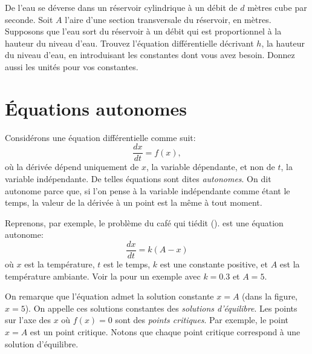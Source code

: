 \begin{exercise}
	De l'eau se déverse dans un réservoir cylindrique à un débit de $d$ mètres cube par seconde.
	Soit $A$ l'aire d'une section transversale du réservoir, en mètres.
	Supposons que l'eau sort du réservoir à un débit qui est proportionnel à la hauteur du niveau d'eau.
	Trouvez l'équation différentielle décrivant $h$, la hauteur du niveau d'eau, en introduisant les constantes dont vous avez besoin.
	Donnez aussi les unités pour vos constantes.
\end{exercise}



\sectionnewpage
\section{Équations autonomes}
\label{auteq:section}


Considérons une équation différentielle comme suit:
\begin{equation*}
	\frac{dx}{dt} = f(x),
\end{equation*}
où la dérivée dépend uniquement de $x$, la variable dépendante, et non de $t$, la variable indépendante.
De telles équations sont dites \emph{autonomes}.
On dit \og{}autonome\fg{} parce que, si l'on pense à la variable indépendante comme étant le temps, la valeur de la dérivée à un point est la même à tout moment.

Reprenons, par exemple, le problème du café qui tiédit ().
 est une équation autonome:
\begin{equation*}
	\frac{dx}{dt} = k (A-x)
\end{equation*}
où $x$ est la température, $t$ est le temps, $k$ est une constante positive,
et $A$ est la température ambiante.
 Voir la  pour un exemple avec $k=0.3$ et $A=5$.

On remarque que l'équation admet la solution constante $x=A$ (dans la figure, $x=5$).
On appelle ces solutions constantes des \emph{solutions d'équilibre}.
Les points sur l'axe des $x$ où $f(x) = 0$ sont des \emph{points critiques}.
Par exemple, le point  $x=A$ est un point critique. Notons que chaque point critique correspond à une solution d'équilibre.

